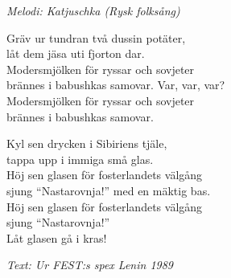 {\footnotesize\textit{Melodi: Katjuschka (Rysk folksång)}}\par
\vspace{10pt}
Gräv ur tundran två dussin potäter,\\
låt dem jäsa uti fjorton dar.\\
Modersmjölken för ryssar och sovjeter\\
brännes i babushkas samovar. Var, var, var?\\
Modersmjölken för ryssar och sovjeter\\
brännes i babushkas samovar.\par
\vspace{10pt}
Kyl sen drycken i Sibiriens tjäle,\\
tappa upp i immiga små glas.\\
Höj sen glasen för fosterlandets välgång\\
sjung ``Nastarovnja!'' med en mäktig bas.\\
Höj sen glasen för fosterlandets välgång\\
sjung ``Nastarovnja!'' \\
Låt glasen gå i kras!\par
\vspace{10pt}
{\footnotesize\textit{Text: Ur FEST:s spex Lenin 1989}}
